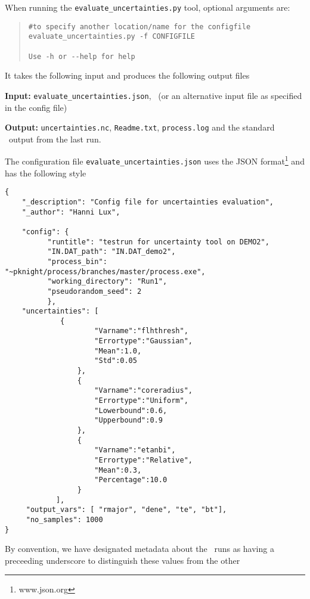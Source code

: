 When running the \texttt{evaluate\_uncertainties.py} tool, optional arguments are:
\begin{quote}
\begin{verbatim}
#to specify another location/name for the configfile
evaluate_uncertainties.py -f CONFIGFILE

Use -h or --help for help
\end{verbatim}
\end{quote}
It takes the following input and produces the following output files
\begin{description}
\item{\textbf{Input:}} \texttt{evaluate\_uncertainties.json}, \indat\ (or an
  alternative input file as specified in the config file)
                                
\item{\textbf{Output:}} \texttt{uncertainties.nc}, \texttt{Readme.txt},
  \texttt{process.log} and the standard \process\ output from the last run.
\end{description}
The configuration file \texttt{evaluate\_uncertainties.json} uses the JSON
format\footnote{www.json.org} and has the following style
\begin{framed}
\begin{verbatim}
{
	"_description": "Config file for uncertainties evaluation",
	"_author": "Hanni Lux",
	
	"config": {
		  "runtitle": "testrun for uncertainty tool on DEMO2",
		  "IN.DAT_path": "IN.DAT_demo2",
		  "process_bin": "~pknight/process/branches/master/process.exe",
		  "working_directory": "Run1",
		  "pseudorandom_seed": 2
		  },
	"uncertainties": [
		     {
               	     "Varname":"flhthresh",
               	     "Errortype":"Gaussian",
               	     "Mean":1.0,
               	     "Std":0.05
          	     },          
          	     {
               	     "Varname":"coreradius",
               	     "Errortype":"Uniform",
               	     "Lowerbound":0.6,
               	     "Upperbound":0.9
          	     },
          	     {
               	     "Varname":"etanbi",
               	     "Errortype":"Relative",
               	     "Mean":0.3,
               	     "Percentage":10.0
          	     } 
	     	],
     "output_vars": [ "rmajor", "dene", "te", "bt"],
     "no_samples": 1000    
}
\end{verbatim}
\end{framed}
By convention, we have designated metadata about the \process\ runs as having
a preceeding underscore to distinguish these values from the other
